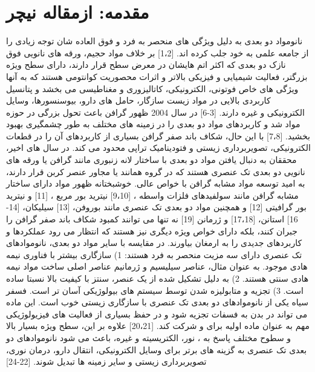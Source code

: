 \section{مقدمه: ازمقاله نیچر}
نانومواد دو بعدی به دلیل ویژگی های منحصر به فرد و فوق العاده شان توجه زیادی را از جامعه علمی به خود جلب کرده اند. [1،2] بر خلاف مواد حجیم، ورقه های نانویی فوق نازک دو بعدی که اکثر اتم هایشان در معرض سطح قرار دارند، دارای سطح ویژه بزرگتر، فعالیت شیمیایی و فیزیکی بالاتر و اثرات محصوریت کوانتومی هستند که به آنها ویژگی های خاص فوتونی، الکترونیکی، کاتالیزوری و مغناطیسی می بخشد و پتانسیل کاربردی بالایی در مواد زیست سازگار، حامل های دارو، بیوسنسورها، وسایل الکترونیکی و غیره دارند. [3-6] در سال 2004 ظهور گرافن باعث تحول بزرگی در حوزه مواد شد و کاربردهای مواد دو بعدی را در زمینه های مختلف به طور چشمگیری بهبود بخشید. [7،8] با این حال، شکاف باند صفر گرافن بسیاری از کاربردهای آن را در قطعات الکترونیکی، تصویربرداری زیستی و فتودینامیک تراپی محدود می کند. در سال های اخیر، محققان به دنبال یافتن مواد دو بعدی با ساختار لانه زنبوری مانند گرافن یا ورقه های نانویی دو بعدی تک عنصری هستند که در گروه همانند یا مجاور عنصر کربن قرار دارند، به امید توسعه مواد مشابه گرافن با خواص عالی. خوشبختانه ظهور مواد دارای ساختار مشابه گرافن مانند سولفیدهای فلزات واسطه ، [9،10] نیترید بور مربع ، [11] و نیترید بور گرافیتی  [12] و همچنین مواد دو بعدی تک عنصری مانند بوروفن، [13] سیلیکان، [14-16] استانن، [17،18] و ژرمانن [19] نه تنها می توانند کمبود شکاف باند صفر گرافن را جبران کنند، بلکه دارای خواص ویژه دیگری نیز هستند که انتظار می رود عملکردها و کاربردهای جدیدی را به ارمغان بیاورند. در مقایسه با سایر مواد دو بعدی، نانوموادهای تک عنصری دارای سه مزیت منحصر به فرد هستند: 1) سازگاری بیشتر با فناوری نیمه هادی موجود. به عنوان مثال، عناصر سیلیسیم و ژرمانیم عناصر اصلی ساخت مواد نیمه هادی سنتی هستند. 2) به دلیل تشکیل شده از یک عنصر، سنتز با کیفیت بالا نسبتا ساده است. 3) تجزیه و متابولیزه شدن توسط سیستم های بیولوژیکی آسان تر است. فسفر سیاه یکی از نانوموادهای دو بعدی تک عنصری با سازگاری زیستی خوب است. این ماده می تواند در بدن به فسفات تجزیه شود و در حفظ بسیاری از فعالیت های فیزیولوژیکی مهم به عنوان ماده اولیه برای  و  شرکت کند. [20،21] علاوه بر این، سطح ویژه بسیار بالا و سطوح مختلف پاسخ به ، نور، الکتریسیته و غیره، باعث می شود نانوموادهای دو بعدی تک عنصری به گزینه های برتر برای وسایل الکترونیکی، انتقال دارو، درمان نوری، تصویربرداری زیستی و سایر زمینه ها تبدیل شوند. [22-24]

